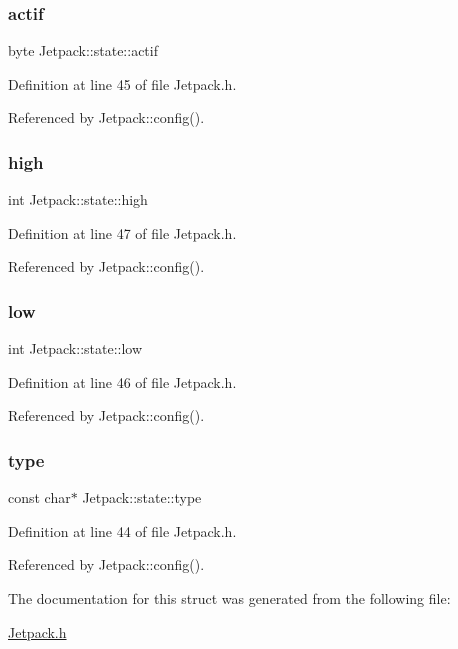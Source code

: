 \subsubsection{\texorpdfstring{actif}{actif}}
{\footnotesize\ttfamily byte Jetpack\+::state\+::actif}



Definition at line 45 of file Jetpack.\+h.



Referenced by Jetpack\+::config().

\mbox{\label{structJetpack_1_1state_a54cc9291c7cc30102a07fd2b0ccd8dde}} 
\subsubsection{\texorpdfstring{high}{high}}
{\footnotesize\ttfamily int Jetpack\+::state\+::high}



Definition at line 47 of file Jetpack.\+h.



Referenced by Jetpack\+::config().

\mbox{\label{structJetpack_1_1state_ace3ecd2b1f262756d8f7a8adda20136a}} 
\subsubsection{\texorpdfstring{low}{low}}
{\footnotesize\ttfamily int Jetpack\+::state\+::low}



Definition at line 46 of file Jetpack.\+h.



Referenced by Jetpack\+::config().

\mbox{\label{structJetpack_1_1state_a59e307555493f5a64f87ac4c63943371}} 
\subsubsection{\texorpdfstring{type}{type}}
{\footnotesize\ttfamily const char$\ast$ Jetpack\+::state\+::type}



Definition at line 44 of file Jetpack.\+h.



Referenced by Jetpack\+::config().



The documentation for this struct was generated from the following file\+:\begin{DoxyCompactItemize}
\item 
\hyperlink{Jetpack_8h}{Jetpack.\+h}\end{DoxyCompactItemize}
